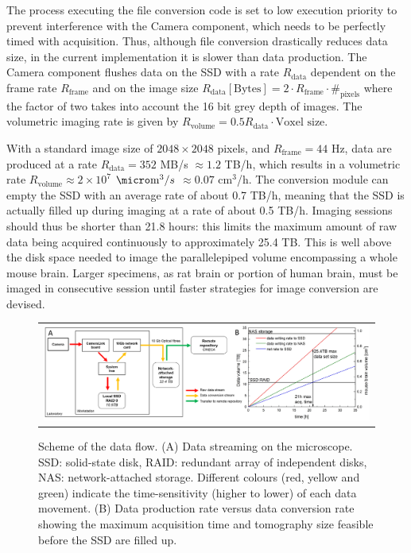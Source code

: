 \documentclass[12pt]{spieman}  %
\begin{document}
The process executing the file conversion code is set to low execution priority to prevent interference with the Camera component, which needs to be perfectly timed with acquisition. Thus, although file conversion drastically reduces data size, in the current implementation it is slower than data production. The Camera component flushes data on the SSD with a rate $R_{\text{data}}$ dependent on the frame rate $R_{\text{frame}}$ and on the image size $R_{\text{data}} [\text{Bytes}] = 2\cdot R_{\text{frame}} \cdot \#_{\text{pixels}}$
where the factor of two takes into account the 16 bit grey depth of images. The volumetric imaging rate is given by $R_{\text{volume}} = 0.5 R_{\text{data}} \cdot \text{Voxel size}$.

With a standard image size of $2048\times 2048$ pixels, and $R_{\text{frame}}=44$ Hz, data are produced at a rate $R_{\text{data}}=352$ MB/s $\approx 1.2$ TB/h, which results in a volumetric rate $R_{\text{volume}} \approx 2\times 10^7$ $\micro\text{m}^3/s$ $\approx 0.07$ $\text{cm}^3$/h. The conversion module can empty the SSD with an average rate of about 0.7 TB/h, meaning that the SSD is actually filled up during imaging at a rate of about 0.5 TB/h. Imaging sessions should thus be shorter than 21.8 hours: this limits the maximum amount of raw data being acquired continuously to approximately 25.4 TB. This is well above the disk space needed to image the parallelepiped volume encompassing a whole mouse brain. Larger specimens, as rat brain or portion of human brain, must be imaged in consecutive session until faster strategies for image conversion are devised.

	\begin{figure}
   \begin{center}
   \begin{tabular}{c}
   \includegraphics[width=\textwidth]{DataFlow.eps}
   \end{tabular}
   \end{center}
   \caption{\label{fig:DataFlow} Scheme of the data flow. (A) Data streaming on the microscope. SSD: solid-state disk, RAID: redundant array of independent disks, NAS: network-attached storage. Different colours (red, yellow and green) indicate the time-sensitivity (higher to lower) of each data movement. (B) Data production rate versus data conversion rate showing the maximum acquisition time and tomography size feasible before the SSD are filled up.} 
   \end{figure}
\end{document}
